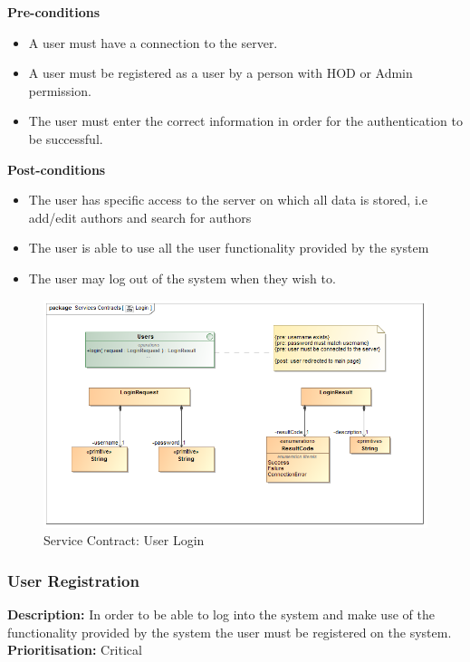 \documentclass[a4paper]{article}
\begin{document}
    
      \textbf{Pre-conditions}
    \begin{itemize}
        \item A user must have a connection to the server.
        \item A user must be registered as a user by a person with HOD or Admin permission.
        \item The user must enter the correct information in order for the authentication to be successful.
    \end{itemize}
    
    \textbf{Post-conditions}
     \begin{itemize}
        \item The user has specific access to the server on which all data is stored, i.e add/edit authors and search for authors
        \item The user is able to use all the user functionality provided by the system 
        \item The user may log out of the system when they wish to.
    \end{itemize}
    
        	\begin{figure}[H]
        		\centering
        		\includegraphics[width=\textwidth]{5.1.1.Login.Services.Contract.png}
        		\caption{Service Contract: User Login}
        	\end{figure}
    
    \pagebreak
    
    \subsubsection{User Registration}
    
    \textbf{Description:}  In order to be able to log into the system and make use of the functionality provided by the system the user must be registered on the system. \\
    \textbf{Prioritisation:} Critical\\
   
\end{document}
